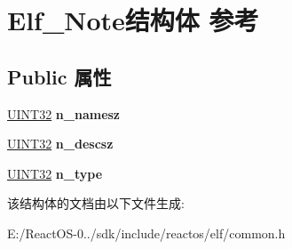 \hypertarget{struct_elf___note}{}\section{Elf\+\_\+\+Note结构体 参考}
\label{struct_elf___note}
\subsection*{Public 属性}
\begin{DoxyCompactItemize}
\item 
\mbox{\label{struct_elf___note_a9f3f3e6291443b3ef71b3eaabb2a04e8}} 
\hyperlink{_processor_bind_8h_ae1e6edbbc26d6fbc71a90190d0266018}{U\+I\+N\+T32} {\bfseries n\+\_\+namesz}
\item 
\mbox{\label{struct_elf___note_a749333e2f2178298f3abac4ccbe8bd71}} 
\hyperlink{_processor_bind_8h_ae1e6edbbc26d6fbc71a90190d0266018}{U\+I\+N\+T32} {\bfseries n\+\_\+descsz}
\item 
\mbox{\label{struct_elf___note_a906128f60c7290efdd1314225b3f955b}} 
\hyperlink{_processor_bind_8h_ae1e6edbbc26d6fbc71a90190d0266018}{U\+I\+N\+T32} {\bfseries n\+\_\+type}
\end{DoxyCompactItemize}


该结构体的文档由以下文件生成\+:\begin{DoxyCompactItemize}
\item 
E\+:/\+React\+O\+S-\/0../sdk/include/reactos/elf/common.\+h\end{DoxyCompactItemize}

